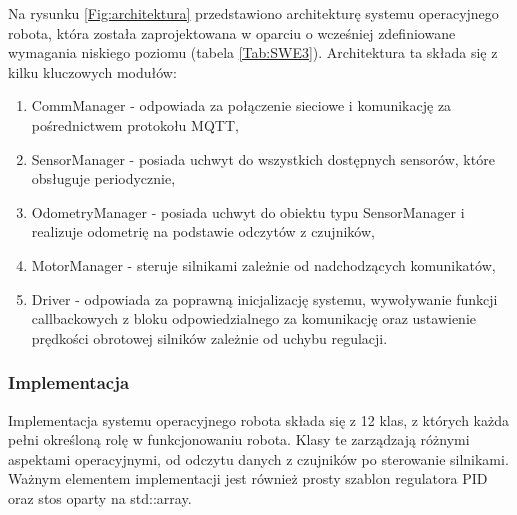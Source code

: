\documentclass[12pt,twoside]{article}
\begin{document}
Na rysunku \ref{Fig:architektura} przedstawiono architekturę systemu operacyjnego robota, która została zaprojektowana w oparciu o wcześniej zdefiniowane wymagania niskiego poziomu (tabela \ref{Tab:SWE3}). Architektura ta składa się z kilku kluczowych modułów:

\begin{enumerate}[label=\alph*), leftmargin=1.25cm]
	\item CommManager - odpowiada za połączenie sieciowe i komunikację za pośrednictwem protokołu MQTT,
	\item SensorManager - posiada uchwyt do wszystkich dostępnych sensorów, które obsługuje periodycznie,
	\item OdometryManager - posiada uchwyt do obiektu typu SensorManager i realizuje odometrię na podstawie odczytów z czujników,
	\item MotorManager - steruje silnikami zależnie od nadchodzących komunikatów,
	\item Driver - odpowiada za poprawną inicjalizację systemu, wywoływanie funkcji callbackowych z bloku odpowiedzialnego za komunikację oraz ustawienie prędkości obrotowej silników zależnie od uchybu regulacji.  
\end{enumerate}

\subsubsection{Implementacja}
Implementacja systemu operacyjnego robota składa się z 12 klas, z których każda pełni określoną rolę w funkcjonowaniu robota. Klasy te zarządzają różnymi aspektami operacyjnymi, od odczytu danych z czujników po sterowanie silnikami. Ważnym elementem implementacji jest również prosty szablon regulatora PID oraz stos oparty na std::array\cite{stdarray}.
\end{document}
